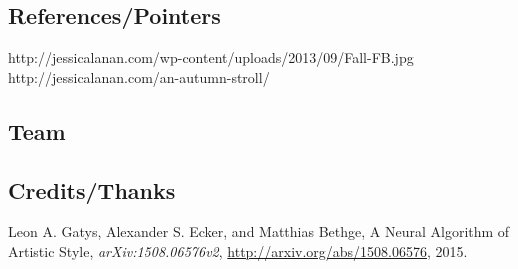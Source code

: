 \documentclass{article}
\begin{document}
\subsection{References/Pointers}

http://jessicalanan.com/wp-content/uploads/2013/09/Fall-FB.jpg
http://jessicalanan.com/an-autumn-stroll/
   
\subsection{Team}

\subsection{Credits/Thanks}


\begin{thebibliography}{9}

 Leon A. Gatys, Alexander S. Ecker, and
  Matthias Bethge, A Neural Algorithm of Artistic Style,
  \emph{arXiv:1508.06576v2}, \url{http://arxiv.org/abs/1508.06576},
  2015.

\end{thebibliography}
\end{document}
